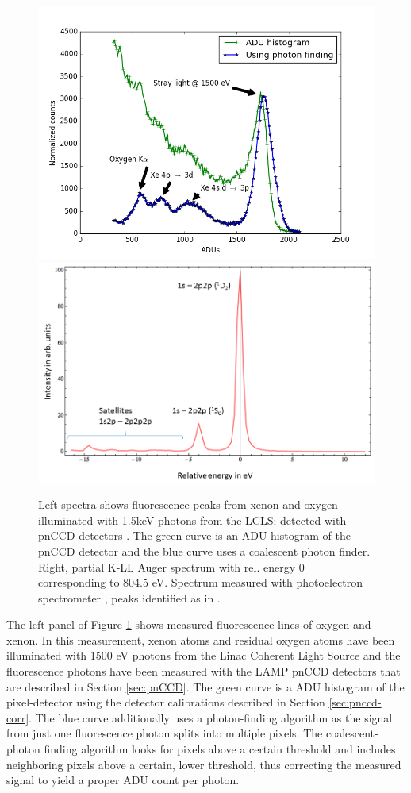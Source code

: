 \begin{figure}
	\centering
		\includegraphics[width=.49\textwidth]{images/pnCCD-histogram.png}
		\includegraphics[width=.49\textwidth]{images/auger-spectra.png}
	\caption[Fluorescence spectra from xenon and neon K-LL Auger spectrum.]{Left spectra shows fluorescence peaks from xenon and oxygen illuminated with 1.5keV photons from the LCLS; detected with pnCCD detectors \citep{Bucher-2016-Unpublished, Rudek-2012-NatPho}. The green curve is an ADU histogram of the pnCCD detector and the blue curve uses a coalescent photon finder. Right, partial K-LL Auger spectrum with rel. energy 0 corresponding to 804.5 eV. Spectrum measured with photoelectron spectrometer \cite{Bucher-2014-Unpublished}, peaks identified as in \citep{Krause-1970-PhysLettA}.}
	\label{fig:pnCCD-histogram}
\end{figure}
The left panel of Figure \ref{fig:pnCCD-histogram} shows measured fluorescence lines of oxygen and xenon. In this measurement, xenon atoms and residual oxygen atoms have been illuminated with 1500 eV photons from the Linac Coherent Light Source and the fluorescence photons have been measured with the LAMP pnCCD detectors that are described in Section \ref{sec:pnCCD}. The green curve is a ADU histogram of the pixel-detector using the detector calibrations described in Section \ref{sec:pnccd-corr}. The blue curve additionally uses a photon-finding algorithm as the signal from just one fluorescence photon splits into multiple pixels. The coalescent-photon finding algorithm looks for pixels above a certain threshold and includes neighboring pixels above a certain, lower threshold, thus correcting the measured signal to yield a proper ADU count per photon.\\[1\baselineskip]
